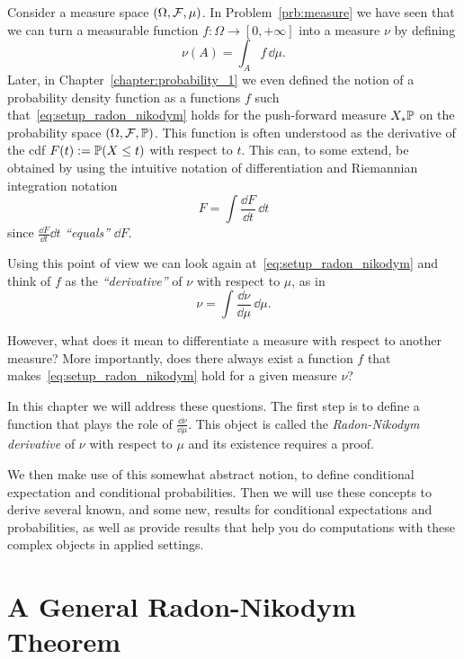 
Consider a measure space $(\Omega, \mathcal F, \mu)$. In Problem~\ref{prb:measure} we have seen that we can turn a measurable function $f : \Omega \to [0,+\infty]$ into a measure $\nu$ by defining
\begin{equation}\label{eq:setup_radon_nikodym}
	\nu(A) = \int_A f \, \dd \mu.
\end{equation}
Later, in Chapter~\ref{chapter:probability_1} we even defined the notion of a probability density function as a functions $f$ such that~\eqref{eq:setup_radon_nikodym} holds for the push-forward measure $X_\ast \mathbb P$ on the probability space $(\Omega, \mathcal F, \mathbb P)$. This function is often understood as the derivative of the cdf $F(t) := \mathbb P(X \le t)$ with respect to $t$. This can, to some extend, be obtained by using the intuitive notation of differentiation and Riemannian integration notation 
\[
	F = \int \frac{\dd F}{\dd t} \, \dd t
\]
since $\frac{\dd F}{\dd t} \dd t$ \textit{``equals''} $\dd F$.

Using this point of view we can look again at~\eqref{eq:setup_radon_nikodym} and think of $f$ as the \textit{``derivative''} of $\nu$ with respect to $\mu$, as in
\[
	\nu = \int \frac{\dd \nu}{\dd \mu} \, \dd \mu.
\]

However, what does it mean to differentiate a measure with respect to another measure? More importantly, does there always exist a function $f$ that makes~\eqref{eq:setup_radon_nikodym} hold for a given measure $\nu$?

In this chapter we will address these questions. The first step is to define a function that plays the role of $\frac{\dd \nu}{\dd \mu}$. This object is called the \emph{Radon-Nikodym derivative} of $\nu$ with respect to $\mu$ and its existence requires a proof. 

We then make use of this somewhat abstract notion, to define conditional expectation and conditional probabilities. Then we will use these concepts to derive several known, and some new, results for conditional expectations and probabilities, as well as provide results that help you do computations with these complex objects in applied settings.

\section{A General Radon-Nikodym Theorem}

